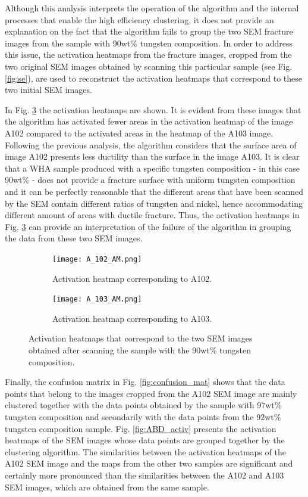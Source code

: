 \documentclass[authoryear,preprint,review,12pt, singleside]{elsarticle}
\begin{document}
Although this analysis interprets the operation of the algorithm and the internal processes that enable the high efficiency clustering, it does not provide an explanation on the fact that the algorithm fails to group the two SEM fracture images from the sample with 90wt\% tungsten composition. In order to address this issue, the activation heatmaps from the fracture images, cropped from the two original SEM images obtained by scanning this particular sample (see Fig. \ref{fig:se}), are used to reconstruct the activation heatmaps that correspond to these two initial SEM images. 

In Fig. \ref{fig:A_activ} the activation heatmaps are shown. It is evident from these images that the algorithm has activated fewer areas in the activation heatmap of the image A102 compared to the activated areas in the heatmap of the A103 image. Following the previous analysis, the algorithm considers that the surface area of image A102 presents less ductility than the surface in the image A103. It is clear that a WHA sample produced with a specific tungsten composition - in this case 90wt\% - does not provide a fracture surface with uniform tungsten composition and it can be perfectly reasonable that the different areas that have been scanned by the SEM contain different ratios of tungsten and nickel, hence accommodating different amount of areas with ductile fracture. Thus, the activation heatmaps in Fig. \ref{fig:A_activ} can provide an interpretation of the failure of the algorithm in grouping the data from these two SEM images.   

\begin{figure}[!h]
	\centering
	\begin{subfigure}[b]{0.49\textwidth}
		\centering
		\texttt{[image: A\_102\_AM.png]}
		\caption{Activation heatmap corresponding to A102.}
		\label{fig:A_102_am}
	\end{subfigure}
	\begin{subfigure}[b]{0.49\textwidth}
		\centering
		\texttt{[image: A\_103\_AM.png]}
		\caption{Activation heatmap corresponding to A103.}
		\label{fig:A_103_am}
	\end{subfigure}
	\caption{Activation heatmaps that correspond to the two SEM images obtained after scanning the sample with the 90wt\% tungsten composition.}
	\label{fig:A_activ}
\end{figure}


Finally, the confusion matrix in Fig. \ref{fig:confusion_mat} shows that the data points that belong to the images cropped from the A102 SEM image are mainly clustered together with the data points obtained by the sample with 97wt\% tungsten composition and secondarily with the data points from the 92wt\% tungsten composition sample. Fig. \ref{fig:ABD_activ} presents the activation heatmaps of the SEM images whose data points are grouped together by the clustering algorithm. The similarities between the activation heatmaps of the A102 SEM image and the maps from the other two samples are significant and certainly more pronounced than the similarities between the A102 and A103 SEM images, which are obtained from the same sample.   
\end{document}
